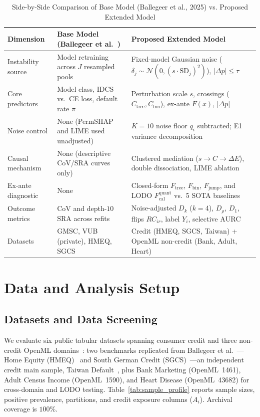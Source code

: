 \documentclass[conference]{IEEEtran}
\begin{document}
\begin{table}[!t]
\centering
\caption{Side-by-Side Comparison of Base Model (Ballegeer et al., 2025) vs. Proposed Extended Model}
\label{tab:base_vs_ext}
\scriptsize
\renewcommand{\arraystretch}{0.77}
\setlength{\tabcolsep}{2.6pt}
\begin{tabular}{@{}p{2.3cm}p{6.5cm}p{7.6cm}@{}}
\toprule
\textbf{Dimension} & \textbf{Base Model (Ballegeer et al.~\cite{ballegeer2025})} & \textbf{Proposed Extended Model} \\
\midrule
Instability source & Model retraining across $J$ resampled pools & Fixed-model Gaussian noise ($\delta_j \sim \mathcal{N}(0,(s\cdot\mathrm{SD}_j)^2)$), $|\Delta p|\le\tau$ \\
Core predictors & Model class, IDCS vs.\ CE loss, default rate $\pi$ & Perturbation scale $s$, crossings ($C_{\mathrm{tree}}, C_{\mathrm{bin}}$), ex-ante $F(x)$, $|\Delta p|$ \\
Noise control & None (PermSHAP and LIME used unadjusted) & $K{=}10$ noise floor $q_i$ subtracted; E1 variance decomposition \\
Causal mechanism & None (descriptive CoV/SRA curves only) & Clustered mediation ($s{\to}C{\to}\Delta E$), double dissociation, LIME ablation \\
Ex-ante diagnostic & None & Closed-form $F_{\mathrm{tree}}$, $F_{\mathrm{bin}}$, $F_{\mathrm{jump}}$, and LODO $F_{\mathrm{cal}}^{\mathrm{quant}}$ vs.\ 5 SOTA baselines \\
Outcome metrics & $\mathrm{CoV}$ and depth-$10$ $\mathrm{SRA}$ across refits & Noise-adjusted $D_k$ ($k{=}4$), $D_\rho$, $D_1$, flips $RC_{ir}$, label $Y_i$, selective $\mathrm{AURC}$ \\
Datasets & GMSC, VUB (private), HMEQ, SGCS & Credit (HMEQ, SGCS, Taiwan) + OpenML non-credit (Bank, Adult, Heart) \\
\bottomrule
\end{tabular}
\end{table}

\section{Data and Analysis Setup}
\label{sec:setup}

\subsection{Datasets and Data Screening}
We evaluate six public tabular datasets spanning consumer credit and three non-credit OpenML domains~\cite{vanschoren2014}: two benchmarks replicated from Ballegeer et al.~\cite{ballegeer2025}---Home Equity (HMEQ)~\cite{baesens2016} and South German Credit (SGCS)~\cite{sgcs2019}---an independent credit main sample, Taiwan Default~\cite{yeh2009}, plus Bank Marketing (OpenML~1461), Adult Census Income (OpenML~1590), and Heart Disease (OpenML~43682) for cross-domain and LODO testing. Table~\ref{tab:sample_profile} reports sample sizes, positive prevalence, partitions, and credit exposure columns ($A_i$). Archival coverage is $100\%$.
\end{document}

